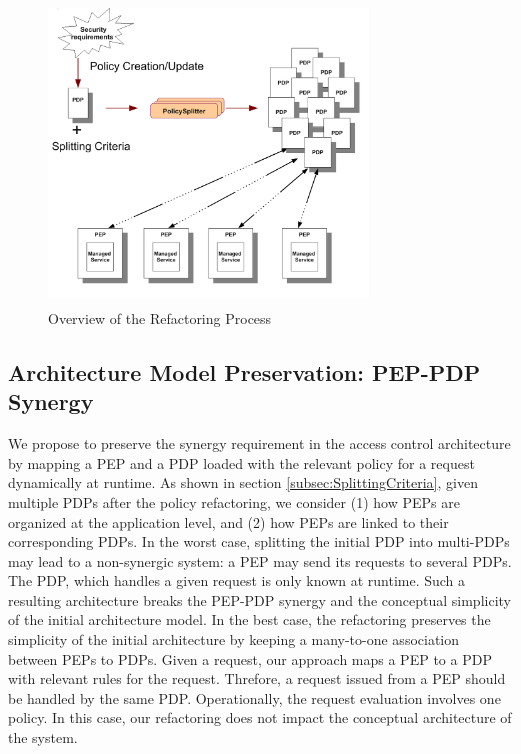 

\begin{figure}[!h]
\begin{center}
\includegraphics[width=8.5cm, height=8cm]{Overall-process}
\caption{Overview of the Refactoring Process}
\label{overallprocess}
\end{center}
\end{figure}


\subsection{Architecture Model Preservation: PEP-PDP Synergy}

We propose to preserve the synergy requirement in the access control architecture by mapping a PEP and a PDP loaded
with the relevant policy for a request dynamically at runtime.
As shown in section \ref{subsec:SplittingCriteria}, given multiple PDPs after the policy refactoring, we consider 
(1) how PEPs are organized at the application level, and (2) how PEPs are linked to their corresponding PDPs.
In the worst case, splitting the initial PDP into multi-PDPs may lead to a non-synergic system: a PEP may send its requests to several PDPs. 
The PDP, which handles a given request is only known at runtime. Such a resulting architecture breaks the PEP-PDP synergy and the conceptual 
simplicity of the initial architecture model. 
In the best case, the refactoring preserves the simplicity of the initial architecture by keeping a many-to-one association 
between PEPs to PDPs. Given a request, our approach maps a PEP to a PDP with relevant rules for the request.
Threfore, a request issued from a PEP should be handled by the same PDP. Operationally, the request evaluation involves 
one policy. In this case, our refactoring does not impact the conceptual architecture of the system.


